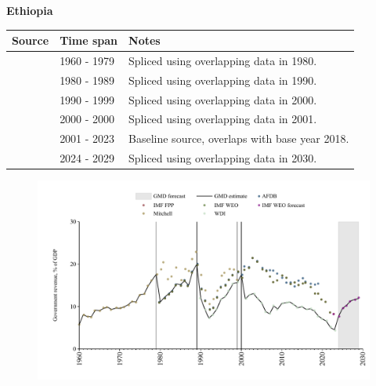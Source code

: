 \documentclass[12pt,a4paper,landscape]{article}
\begin{document}
\begin{adjustbox}{max totalsize={\paperwidth}{\paperheight},center}
\begin{minipage}[t][\textheight][t]{\textwidth}
\vspace*{0.5cm}
{}
\begin{center}
{\Large\bfseries Ethiopia}
\end{center}
\vspace{0.5cm}
\begin{table}[H]
\centering
\small
\begin{tabular}{|l|l|l|}
\hline
\textbf{Source} & \textbf{Time span} & \textbf{Notes} \\
\hline
\rowcolor{white}\cite{Mitchell}& 1960 - 1979 &Spliced using overlapping data in 1980.\\
\rowcolor{lightgray}\cite{AFDB}& 1980 - 1989 &Spliced using overlapping data in 1990.\\
\rowcolor{white}\cite{WDI}& 1990 - 1999 &Spliced using overlapping data in 2000.\\
\rowcolor{lightgray}\cite{AFDB}& 2000 - 2000 &Spliced using overlapping data in 2001.\\
\rowcolor{white}\cite{WDI}& 2001 - 2023 &Baseline source, overlaps with base year 2018.\\
\rowcolor{lightgray}\cite{IMF_WEO_forecast}& 2024 - 2029 &Spliced using overlapping data in 2030.\\
\hline
\end{tabular}
\end{table}
\begin{figure}[H]
\centering
\includegraphics[width=\textwidth,height=0.6\textheight,keepaspectratio]{graphs/ETH_govrev_GDP.pdf}
\end{figure}
\end{minipage}
\end{adjustbox}
\end{document}
